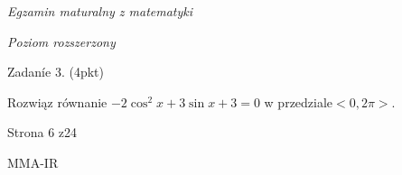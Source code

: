 \documentclass[a4paper,12pt]{article}
\begin{document}
{\it Egzamin maturalny z matematyki}

{\it Poziom rozszerzony}

Zadaníe 3. (4pkt)

Rozwiąz równanie $-2\cos^{2}x+3\sin x+3=0$ w przedziale$<0,2\pi>.$

Strona 6 z24

MMA-IR
\end{document}
